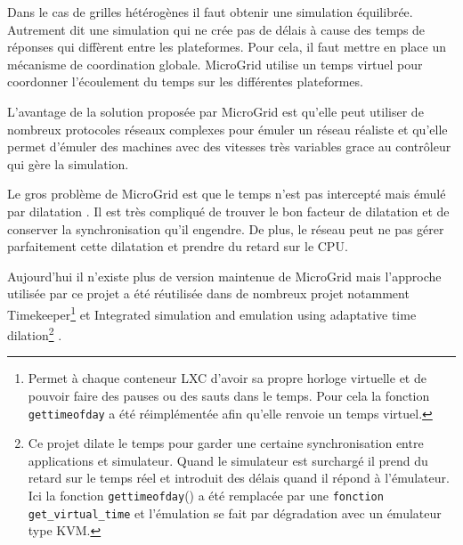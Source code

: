 Dans le cas de grilles hétérogènes il faut obtenir une simulation équilibrée. Autrement dit une simulation qui ne crée pas de délais à cause des temps de réponses qui diffèrent entre les plateformes. Pour cela, il faut mettre en place un mécanisme de coordination globale. MicroGrid utilise un temps virtuel pour coordonner l'écoulement du temps sur les différentes plateformes.

L'avantage de la solution proposée par MicroGrid est qu'elle peut utiliser de nombreux protocoles réseaux complexes pour émuler un réseau réaliste et qu'elle permet d'émuler des machines avec des vitesses très variables grace au contrôleur qui gère la simulation.

Le gros problème de MicroGrid est que le temps n'est pas intercepté mais émulé par dilatation \citep{MICROGRID_lee2014integrated}. Il est très compliqué de trouver le bon facteur de dilatation et de conserver la synchronisation qu'il engendre. De plus, le réseau peut ne pas gérer parfaitement cette dilatation et prendre du retard sur le CPU.

Aujourd'hui il n'existe plus de version maintenue de MicroGrid mais l'approche utilisée par ce projet a été réutilisée dans de nombreux projet notamment Timekeeper\footnote{Permet à chaque conteneur LXC d'avoir sa propre horloge virtuelle et de pouvoir faire des pauses ou des sauts dans le temps. Pour cela la fonction \texttt{gettimeofday} a été réimplémentée afin qu'elle renvoie un temps virtuel.} \citep{MICROGRID_lamps2014timekeeper} et Integrated simulation and emulation using adaptative time dilation\footnote{Ce projet  dilate le temps pour garder une certaine synchronisation entre applications et simulateur. Quand le simulateur est surchargé il prend du retard sur le temps réel et introduit des délais quand il répond à l'émulateur. Ici la fonction \texttt{gettimeofday}() a été remplacée par une \texttt{fonction get\_virtual\_time} et l'émulation se fait par dégradation avec un émulateur type KVM.} \citep{MICROGRID_lee2014integrated}.
